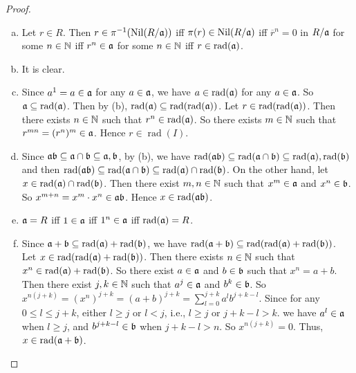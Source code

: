 \begin{proof}
    \begin{enumerate}[(a)]
        \item Let $r \in R$. Then $r \in \pi^{-1}(\operatorname{Nil}(R/\mathfrak{a}))$ iff $\pi(r) \in \operatorname{Nil}(R/\mathfrak{a})$ iff $\overline r^n = 0$ in $R/\mathfrak{a}$ for some $n \in \mathbb{N}$ iff $r^n \in \mathfrak{a}$ for some $n \in \mathbb{N}$ iff $r \in \operatorname{rad}(\mathfrak{a})$.
        \item It is clear.
        \item Since $a^1 = a \in \mathfrak{a}$ for any $a \in \mathfrak{a}$, we have $a \in \operatorname{rad}(\mathfrak{a})$ for any $a \in \mathfrak{a}$. So $\mathfrak{a} \subseteq \operatorname{rad}(\mathfrak{a})$. Then by (b), $\operatorname{rad}(\mathfrak{a}) \subseteq \operatorname{rad}(\operatorname{rad}(\mathfrak{a}))$. Let $r \in \operatorname{rad}(\operatorname{rad}(\mathfrak{a}))$. Then there exists $n \in \mathbb{N}$ such that $r^n \in \operatorname{rad}(\mathfrak{a})$. So there exists $m \in \mathbb{N}$ such that $r^{mn} = (r^n)^m \in \mathfrak{a}$. Hence $r \in \operatorname{rad}(I)$. 
        \item Since $\mathfrak{a}\mathfrak{b} \subseteq \mathfrak{a} \cap \mathfrak{b} \subseteq \mathfrak{a},\mathfrak{b}$, by (b), we have $\operatorname{rad}(\mathfrak{a}\mathfrak{b}) \subseteq \operatorname{rad}(\mathfrak{a} \cap \mathfrak{b}) \subseteq \operatorname{rad}(\mathfrak{a}),\operatorname{rad}(\mathfrak{b})$ and then $\operatorname{rad}(\mathfrak{a}\mathfrak{b}) \subseteq \operatorname{rad}(\mathfrak{a} \cap \mathfrak{b}) \subseteq \operatorname{rad}(\mathfrak{a}) \cap \operatorname{rad}(\mathfrak{b})$. On the other hand, let $x \in \operatorname{rad}(\mathfrak{a}) \cap \operatorname{rad}(\mathfrak{b})$. Then there exist $m,n \in \mathbb{N}$ such that $x^m \in \mathfrak{a}$ and $x^n \in \mathfrak{b}$. So $x^{m+n} = x^m \cdot x^n \in \mathfrak{a} \mathfrak{b}$. Hence $x \in \operatorname{rad}(\mathfrak{a}\mathfrak{b})$.
        \item $\mathfrak{a} = R$ iff $1 \in \mathfrak{a}$ iff $1^n \in \mathfrak{a}$ iff $\operatorname{rad}(\mathfrak{a}) = R$. 
        \item Since $\mathfrak{a} + \mathfrak{b} \subseteq \operatorname{rad}(\mathfrak{a}) + \operatorname{rad}(\mathfrak{b})$, we have $\operatorname{rad}(\mathfrak{a} + \mathfrak{b}) \subseteq \operatorname{rad}(\operatorname{rad}(\mathfrak{a}) + \operatorname{rad}(\mathfrak{b}))$. \\
            Let $x \in \operatorname{rad}(\operatorname{rad}(\mathfrak{a}) + \operatorname{rad}(\mathfrak{b}))$. Then there exists $n \in \mathbb{N}$ such that $x^n \in \operatorname{rad}(\mathfrak{a}) + \operatorname{rad}(\mathfrak{b})$. So there exist $a \in \mathfrak{a}$ and $b \in \mathfrak{b}$ such that $x^n = a + b$. Then there exist $j,k \in \mathbb{N}$ such that $a^j \in \mathfrak{a}$ and $b^k \in \mathfrak{b}$. So $x^{n(j+k)} = (x^n)^{j+k} = (a+b)^{j+k} = \sum_{l = 0}^{j+k} a^lb^{j+k-l}$. Since for any $0 \leq l \leq j+k$, either $l \geq j$ or $l < j$, i.e., $l \geq j$ or $j+k-l > k$. we have $a^l \in \mathfrak{a}$ when $l \geq j$, and $b^{j+k-l} \in \mathfrak{b}$ when $j + k - l > n$. So $x^{n(j+k)} = 0$. Thus, $x\in \operatorname{rad}(\mathfrak{a}+\mathfrak{b})$.

\end{enumerate}
\end{proof}
